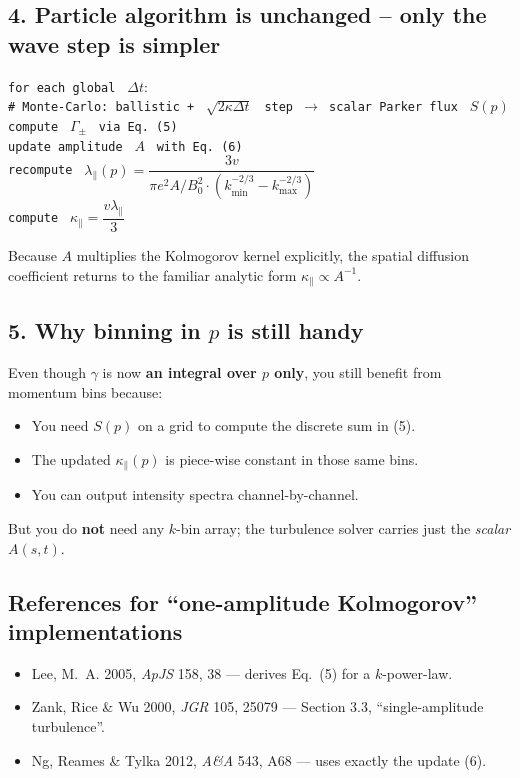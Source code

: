 \subsection*{4. Particle algorithm is unchanged – only the wave step is simpler}
\begin{tabbing}
\hspace{2em} \= \texttt{for each global } $\Delta t$: \\
\> \hspace{2em} \= \texttt{\# Monte-Carlo: ballistic + } $\sqrt{2\kappa\Delta t}$ \texttt{ step $\rightarrow$ scalar Parker flux } $S(p)$ \\
\> \texttt{compute } $\Gamma_{\pm}$ \texttt{ via Eq. (5)} \\
\> \texttt{update amplitude } $A$ \texttt{ with Eq. (6)} \\
\> \texttt{recompute } $\lambda_\parallel(p) = \dfrac{3v}{\pi e^2 A / B_0^2 \cdot \left( k_{\min}^{-2/3} - k_{\max}^{-2/3} \right)}$ \\
\> \texttt{compute } $\kappa_\parallel = \dfrac{v \lambda_\parallel}{3}$
\end{tabbing}
Because \(A\) multiplies the Kolmogorov kernel explicitly, the spatial diffusion coefficient returns to the familiar analytic form \( \kappa_\parallel \propto A^{-1} \).

\subsection*{5. Why binning in \(p\) is still handy}

Even though \(\gamma\) is now \textbf{an integral over \(p\) only}, you still benefit from momentum bins because:
\begin{itemize}
\item You need \(S(p)\) on a grid to compute the discrete sum in (5).
\item The updated \(\kappa_\parallel(p)\) is piece-wise constant in those same bins.
\item You can output intensity spectra channel-by-channel.
\end{itemize}
But you do \textbf{not} need any \(k\)-bin array; the turbulence solver carries just the \emph{scalar} \(A(s,t)\).

\subsection*{References for ``one-amplitude Kolmogorov'' implementations}
\begin{itemize}
\item Lee, M.~A. 2005, \textit{ApJS} 158, 38 — derives Eq.~(5) for a \(k\)-power-law.
\item Zank, Rice \& Wu 2000, \textit{JGR} 105, 25079 — Section 3.3, ``single-amplitude turbulence''.
\item Ng, Reames \& Tylka 2012, \textit{A\&A} 543, A68 — uses exactly the update (6).
\end{itemize}

